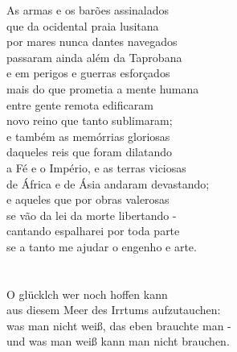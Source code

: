 \documentclass{minimal}
\begin{document}
As armas e os barões assinalados\\
que da ocidental praia lusitana\\
por mares nunca dantes navegados\\
passaram ainda além da Taprobana\\
e em perigos e guerras esforçados\\
mais do que prometia a mente humana\\
entre gente remota edificaram\\
novo reino que tanto sublimaram;\\ %

e também as memórrias gloriosas\\
daqueles reis que foram dilatando\\
a Fé e o Império, e as terras viciosas\\
de África e de Ásia andaram devastando;\\
e aqueles que por obras valerosas\\
se vão da lei da morte libertando -\\
cantando espalharei por toda parte\\
se a tanto me ajudar o engenho e arte.\\\\\\

O glücklch wer noch hoffen kann\\
aus diesem Meer des Irrtums aufzutauchen:\\
was man nicht weiß, das eben brauchte man -\\
und was man weiß kann man nicht brauchen.


 
\end{document}
